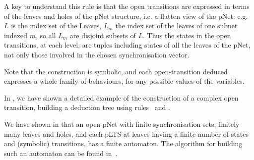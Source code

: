 \documentclass{lmcs}
\newcommand{\TODO}[1]{\textcolor{red}{\textbf{[TODO:#1]}}}
\begin{document}
        	A key to understand this rule is that the open transitions are
	expressed in terms of the leaves and holes of the pNet structure,
	i.e. a flatten view of the pNet: e.g. $L$ is the index set of the
	Leaves, $L_m$ the index set of the leaves of one subnet indexed $m$, so all $L_m$
	are disjoint subsets of $L$. Thus the states in the open transitions,
	at each level, are tuples including states of all the
	leaves of the pNet, not only those involved in the chosen
	synchronisation vector.


Note that  the construction is symbolic, and each open-transition deduced expresses a whole family of
behaviours, for any possible values of the variables.
%

In \cite{henrio:Forte2016}, we have shown a detailed example of the construction of a complex open transition, building a deduction tree using rules \TrUn ~and \TrDeux.



We have shown in \cite{henrio:Forte2016} that an open-pNet
with finite synchronisation sets, finitely many leaves and
holes, and each pLTS at leaves having a finite number of states and
(symbolic) transitions, has a finite automaton. The algorithm for building such an automaton can be found in~\cite{QBMZ-AVOCS18}.



\end{document}
